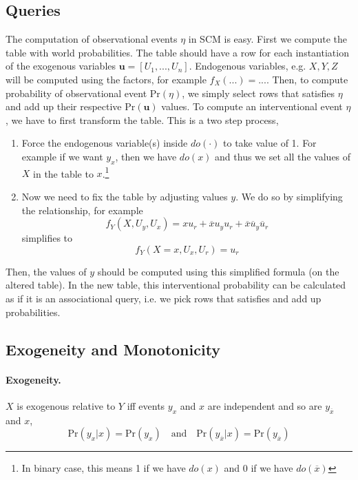 \documentclass[11pt]{article}
\newcommand{\bu}{\mathbf{u}}
\newcommand{\pr}{\mathrm{Pr}}
\begin{document}
\subsection{Queries}
The computation of observational events $\eta$ in SCM is easy. First we compute the table with world probabilities. The table should have a row for each instantiation of the exogenous variables $\bu = [U_1, ..., U_n]$. Endogenous variables, e.g. $X, Y, Z$ will be computed using the factors, for example $f_X(...) = ...$. Then, to compute probability of observational event $\pr(\eta)$, we simply select rows that satisfies $\eta$ and add up their respective $\pr(\bu)$ values. To compute an interventional event $\eta$, we have to first transform the table. This is a two step process, 
\begin{enumerate}
	\item Force the endogenous variable(s) inside $do(\cdot)$ to take value of 1. For example if we want $y_x$, then we have $do(x)$ and thus we set all the values of $X$ in the table to $x$.\footnote{In binary case, this means 1 if we have $do(x)$ and 0 if we have $do(\overbar x)$} 
	\item Now we need to fix the table by adjusting values $y$. We do so by simplifying the relationship, for example
	\begin{equation}
		f_Y(X, U_y, U_x) = xu_r + \overbar x u_y u_r + \overbar x \overbar u _y \overbar u_r
	\end{equation}
	simplifies to 
	\begin{equation}
		f_Y(X = x, U_x, U_r) = u_r
	\end{equation}
\end{enumerate}
Then, the values of $y$ should be computed using this simplified formula (on the altered table). In the new table, this interventional probability can be calculated as if it is an associational query, i.e. we pick rows that satisfies and add up probabilities. 

\subsection{Exogeneity and Monotonicity}
\paragraph{Exogeneity.} $X$ is exogenous relative to $Y$ iff events $y_x$ and $x$ are independent and so are $y_{\overbar x}$ and $x$,
\begin{equation}
	\pr (y_x | x) = \pr (y_x) \quad \text{and} \quad \pr (y_{\overbar x}| x) = \pr ( y_{\overbar x}) 
\end{equation}
\end{document}
